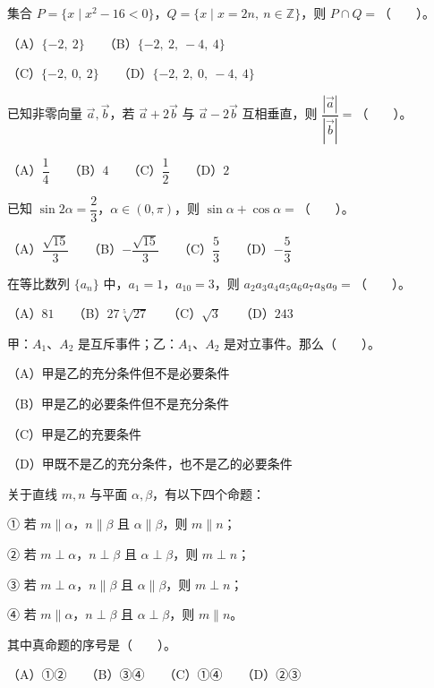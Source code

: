 \begin{question}
集合 $P=\{x\mid x^2-16<0\}$，$Q=\{x\mid x=2n,\ n\in\mathbb Z\}$，则 $P\cap Q=$\mbox{（　　）}。

（A）$\{-2,\ 2\}$　　（B）$\{-2,\ 2,\ -4,\ 4\}$

（C）$\{-2,\ 0,\ 2\}$　　（D）$\{-2,\ 2,\ 0,\ -4,\ 4\}$

\end{question}
\begin{question}
已知非零向量 $\vec a,\vec b$，若 $\vec a+2\vec b$ 与 $\vec a-2\vec b$ 互相垂直，则 $\dfrac{|\vec a|}{|\vec b|}=$\mbox{（　　）}。

（A）$\dfrac14$　　（B）$4$　　（C）$\dfrac12$　　（D）$2$

\end{question}
\begin{question}
已知 $\sin 2\alpha=\dfrac23$，$\alpha\in(0,\pi)$，则 $\sin\alpha+\cos\alpha=$\mbox{（　　）}。

（A）$\dfrac{\sqrt{15}}3$　　（B）$-\dfrac{\sqrt{15}}3$　　（C）$\dfrac53$　　（D）$-\dfrac53$

\end{question}
\begin{question}
在等比数列 $\{a_n\}$ 中，$a_1=1$，$a_{10}=3$，则 $a_2a_3a_4a_5a_6a_7a_8a_9=$\mbox{（　　）}。

（A）$81$　　（B）$27\sqrt[5]{27}$　　（C）$\sqrt3$　　（D）$243$

\end{question}
\begin{question}
甲：$A_1\text{、}A_2$ 是互斥事件；乙：$A_1\text{、}A_2$ 是对立事件。那么\mbox{（　　）}。

（A）甲是乙的充分条件但不是必要条件

（B）甲是乙的必要条件但不是充分条件

（C）甲是乙的充要条件

（D）甲既不是乙的充分条件，也不是乙的必要条件

\end{question}
\begin{question}
关于直线 $m,n$ 与平面 $\alpha,\beta$，有以下四个命题：

① 若 $m\parallel\alpha$，$n\parallel\beta$ 且 $\alpha\parallel\beta$，则 $m\parallel n$；

② 若 $m\perp\alpha$，$n\perp\beta$ 且 $\alpha\perp\beta$，则 $m\perp n$；

③ 若 $m\perp\alpha$，$n\parallel\beta$ 且 $\alpha\parallel\beta$，则 $m\perp n$；

④ 若 $m\parallel\alpha$，$n\perp\beta$ 且 $\alpha\perp\beta$，则 $m\parallel n$。

其中真命题的序号是\mbox{（　　）}。

（A）①②　　（B）③④　　（C）①④　　（D）②③

\end{question}
